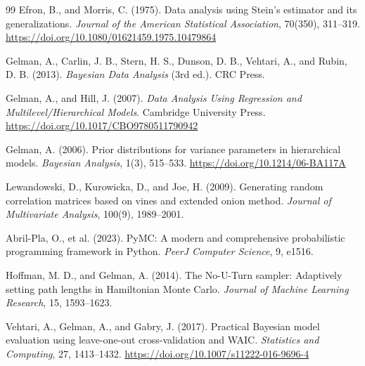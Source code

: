\documentclass[11pt,a4paper]{article}
\begin{document}
\newpage
\begingroup
\small
{}
\begin{thebibliography}{99}
\setlength{\itemsep}{0.15em}
Efron, B., and Morris, C. (1975).
Data analysis using Stein's estimator and its generalizations.
\emph{Journal of the American Statistical Association}, 70(350), 311--319.
\url{https://doi.org/10.1080/01621459.1975.10479864}

Gelman, A., Carlin, J. B., Stern, H. S., Dunson, D. B., Vehtari, A., and Rubin, D. B. (2013).
\emph{Bayesian Data Analysis} (3rd ed.). CRC Press.

Gelman, A., and Hill, J. (2007).
\emph{Data Analysis Using Regression and Multilevel/Hierarchical Models}.
Cambridge University Press. \url{https://doi.org/10.1017/CBO9780511790942}

Gelman, A. (2006). Prior distributions for variance parameters in hierarchical models.
\emph{Bayesian Analysis}, 1(3), 515--533.
\url{https://doi.org/10.1214/06-BA117A}

Lewandowski, D., Kurowicka, D., and Joe, H. (2009).
Generating random correlation matrices based on vines and extended onion method.
\emph{Journal of Multivariate Analysis}, 100(9), 1989--2001.

Abril-Pla, O., et al. (2023).
PyMC: A modern and comprehensive probabilistic programming framework in Python.
\emph{PeerJ Computer Science}, 9, e1516.

Hoffman, M. D., and Gelman, A. (2014).
The No-U-Turn sampler: Adaptively setting path lengths in Hamiltonian Monte Carlo.
\emph{Journal of Machine Learning Research}, 15, 1593--1623.

Vehtari, A., Gelman, A., and Gabry, J. (2017).
Practical Bayesian model evaluation using leave-one-out cross-validation and WAIC.
\emph{Statistics and Computing}, 27, 1413--1432.
\url{https://doi.org/10.1007/s11222-016-9696-4}
\end{thebibliography}
\endgroup
\end{document}
